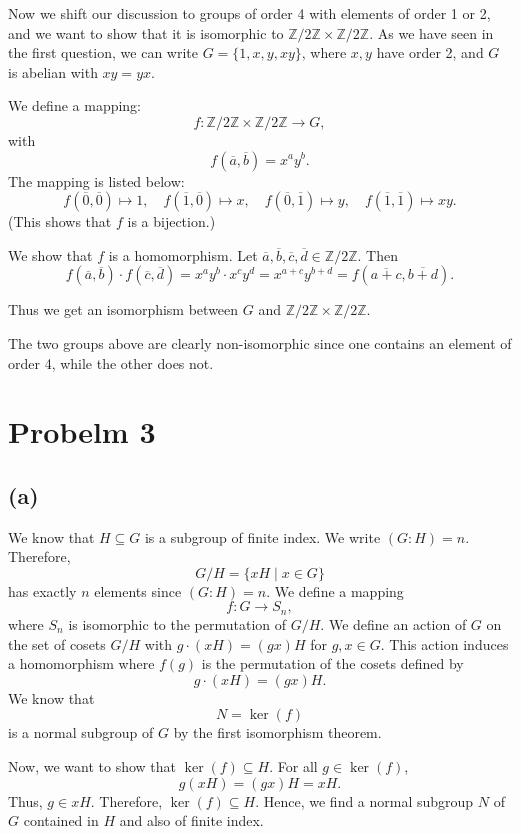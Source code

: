 \documentclass{article}
\begin{document}
Now we shift our discussion to groups of order 4 with elements of order 1 or 2, and we want to show that it is isomorphic to \( \mathbb{Z}/2\mathbb{Z} \times \mathbb{Z}/2\mathbb{Z} \). As we have seen in the first question, we can write \( G = \{1, x, y, xy\} \), where \( x, y \) have order 2, and \( G \) is abelian with \( xy = yx \).

We define a mapping:
\[
f : \mathbb{Z}/2\mathbb{Z} \times \mathbb{Z}/2\mathbb{Z} \to G,
\]
with 
\[
f(\overline{a}, \overline{b}) = x^a y^b.
\]
The mapping is listed below:
\[
f(\overline{0}, \overline{0}) \mapsto 1, \quad f(\overline{1}, \overline{0}) \mapsto x, \quad f(\overline{0}, \overline{1}) \mapsto y, \quad f(\overline{1}, \overline{1}) \mapsto xy.
\]
(This shows that \( f \) is a bijection.)

We show that \( f \) is a homomorphism. Let \( \overline{a}, \overline{b}, \overline{c}, \overline{d} \in \mathbb{Z}/2\mathbb{Z} \). Then
\[
f(\overline{a}, \overline{b}) \cdot f(\overline{c}, \overline{d}) = x^a y^b \cdot x^c y^d = x^{a+c} y^{b+d} = f(\overline{a+c}, \overline{b+d}).
\]

Thus we get an isomorphism between \( G \) and \( \mathbb{Z}/2\mathbb{Z} \times \mathbb{Z}/2\mathbb{Z} \).

The two groups above are clearly non-isomorphic since one contains an element of order 4, while the other does not.

\section*{Probelm 3}
\subsection*{(a)}
We know that \( H \subseteq G \) is a subgroup of finite index. We write \( (G : H) = n \). Therefore, 
\[
G/H = \{xH \mid x \in G\}
\]
has exactly \( n \) elements since \( (G : H) = n \). We define a mapping 
\[
f: G \to S_n,
\]
where \( S_n \) is isomorphic to the permutation of \( G/H \). We define an action of \( G \) on the set of cosets \( G/H \) with \( g \cdot (xH) = (gx)H \) for \( g, x \in G \). This action induces a homomorphism where \( f(g) \) is the permutation of the cosets defined by 
\[
g \cdot (xH) = (gx)H.
\]
We know that 
\[
N = \ker(f)
\]
is a normal subgroup of \( G \) by the first isomorphism theorem. 

Now, we want to show that \( \ker(f) \subseteq H \). For all \( g \in \ker(f) \), 
\[
g(xH) = (gx)H = xH.
\]
Thus, \( g \in xH \). Therefore, \( \ker(f) \subseteq H \). Hence, we find a normal subgroup \( N \) of \( G \) contained in \( H \) and also of finite index.
\end{document}
